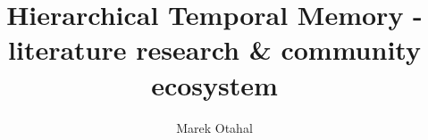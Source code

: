 \documentclass[]{article}
\title{Hierarchical Temporal Memory - literature research \& community ecosystem}
\author{Marek Otahal}
\begin{document}
\maketitle

\begin{abstract}

\end{abstract}

\section{}
\end{document}
